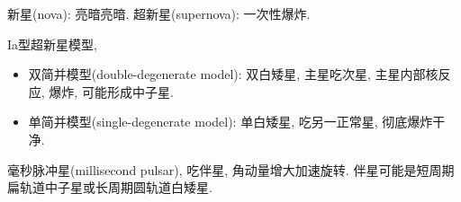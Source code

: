 新星(nova): 亮暗亮暗. 超新星(supernova): 一次性爆炸.

Ia型超新星模型,
\begin{itemize}
    \item 双简并模型(double-degenerate model): 双白矮星, 主星吃次星, 主星内部核反应, 爆炸, 可能形成中子星.
    \item 单简并模型(single-degenerate model): 单白矮星, 吃另一正常星, 彻底爆炸干净.
\end{itemize}

毫秒脉冲星(millisecond pulsar), 吃伴星, 角动量增大加速旋转. 伴星可能是短周期扁轨道中子星或长周期圆轨道白矮星.
